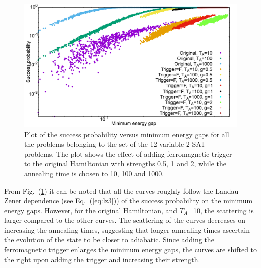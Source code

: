 \documentclass[../main.tex]{subfiles}
\begin{document}
\begin{figure}[H]
\centering
\includegraphics[scale=0.24]{SuccVsGap_OF_g.png}
\caption{Plot of the success probability versus minimum energy gaps for all the problems belonging to the set of the 12-variable 2-SAT problems. The plot shows the effect of adding ferromagnetic trigger to the original Hamiltonian with strengths 0.5, 1 and 2, while the annealing time is chosen to 10, 100 and 1000.}
\label{fig:f14}
\end{figure} 

From Fig.~(\ref{fig:f14}) it can be noted that all the curves roughly follow the Landau-Zener dependence (see Eq.~(\ref{eq:lz3})) of the success probability on the minimum energy gaps. However, for the original Hamiltonian, and $T_A$=10, the scattering is larger compared to the other curves. The scattering of the curves decreases on increasing the annealing times, suggesting that longer annealing times ascertain the evolution of the state to be closer to adiabatic. Since adding the ferromagnetic trigger enlarges the minimum energy gaps, the curves are shifted to the right upon adding the trigger and increasing their strength. 
\end{document}
